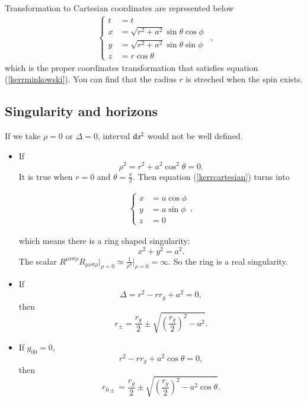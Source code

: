 \documentclass[openany,10pt]{book}
\theoremstyle{definition}
\theoremstyle{definition}
\theoremstyle{remark}
\begin{document}
Transformation to Cartesian coordinates are represented below
\begin{equation}
\label{kerrcartesian}
    \begin{aligned}
    \begin{cases}
    t&=t\\
    x&=\sqrt{r^2+a^2}\sin{\theta}\cos{\phi}\\
    y&=\sqrt{r^2+a^2}\sin{\theta}\sin{\phi}\\
    z&=r\cos{\theta}
    \end{cases}
\end{aligned},
\end{equation}
which is the proper coordinates transformation that satisfies equation (\ref{kerrminkowski}). You can find that the radius $r$ is streched when the spin exists.

\subsection{Singularity and horizons}
If we take $\rho=0$ or $\Delta=0$, interval ${\rm d}s^2$ would not be well defined. 

\begin{itemize}
    \item If
\begin{equation}
    \rho^2=r^2+a^2\cos^2{\theta}=0.
\end{equation}
It is true when $r=0$ and $\theta=\frac{\pi}{2}$. Then equation (\ref{kerrcartesian}) turns into

\begin{equation}
    \begin{aligned}\begin{cases}
    x&=a\cos{\phi}\\
    y&=a\sin{\phi}\\
    z&=0
    \end{cases},
\end{aligned}
\end{equation}

 which means there is a ring shaped singularity:
\begin{equation}
    x^2+y^2=a^2.
\end{equation}
The scalar $R^{\mu\nu\sigma\rho}R_{\mu\nu\sigma\rho}\Big|_{\rho=0}\simeq\frac{1}{\rho^6}\Big|_{\rho=0}=\infty$. So the ring is a real singularity.

\item If
\begin{equation}
    \Delta =r^2-rr_g+a^2=0,
\end{equation}
then
\begin{equation}
    r_\pm=\frac{r_g}2\pm \sqrt{\left(\frac{r_g}2\right)^2-a^2}.
\end{equation}


\item If $g_{00}=0$,
\begin{equation}
r^2-rr_g+a^2\cos{\theta}=0,
\end{equation}
then
\begin{equation}
    r_{0\pm}=\frac{r_g}2\pm \sqrt{\left(\frac{r_g}2\right)^2-a^2\cos{\theta}}.
\end{equation}
\end{itemize}
\end{document}
